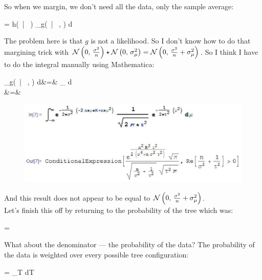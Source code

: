 So when we margin, we don't need all the data, only the sample average:

\beqn
\cprob{\Rlonetonl}{\sigsq} = h(\Rlonetonl ~|~ \sigsq) \int_\reals g(\Rbar ~|~ \mu, \sigsq) \prob{\mu; \sigsq_\mu} d\mu
\eeqn

The problem here is that $g$ is not a likelihood. So I don't know how to do that margining trick with $\mathcal{N}\left(0,\,\frac{\sigma^2}{n}\right) \star \mathcal{N}\left(0,\,\sigma^2_\mu\right) = \mathcal{N}\left(0,\,\frac{\sigma^2}{n} + \sigma^2_\mu\right)$. So I think I have to do the integral manually using Mathematica:

\beqn
\int_\reals g(\Rbar ~|~ \mu, \sigsq) \prob{\mu; \sigsq_\mu} d\mu &=& \int_\reals {} \oneoversqrt{2\pi\sigsq_\mu} \exp{-\oneover{2\sigsq_\mu} \musq} d\mu \\
&=&  
\eeqn

\begin{figure}
\begin{center}
\includegraphics[width=6in]{integrate_out_mu2.eps}
\end{center}
\end{figure}
\FloatBarrier

And this result does not appear to be equal to $\mathcal{N}\left(0,\,\frac{\sigma^2}{n} + \sigma^2_\mu\right)$. \\

Let's finish this off by returning to the probability of the tree which was:

\beqn
{} = 
\eeqn

What about the denominator --- the probability of the data? The probability of the data is weighted over every possible tree configuration:

\beqn
\cprob{\R}{\sigsq} = \int_{T \in {}}   dT
\eeqn

